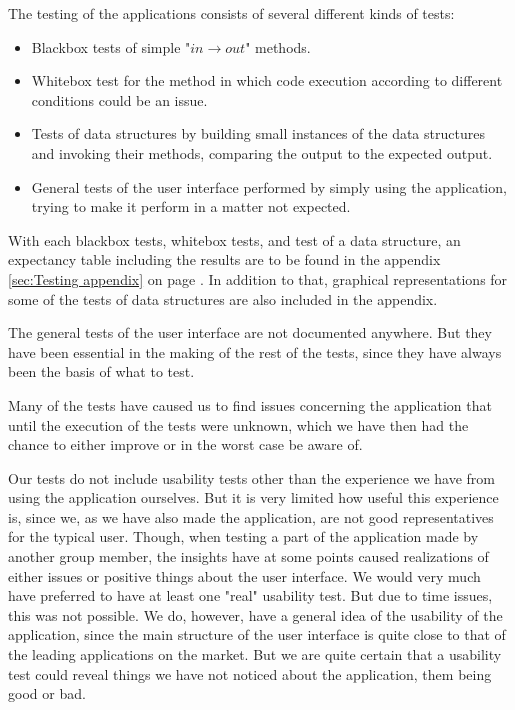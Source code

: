 The testing of the applications consists of several different kinds of tests:
\begin{itemize}
	\item Blackbox tests of simple "$in \rightarrow out$" methods.
	\item Whitebox test for the method in which code execution according to different conditions could be an issue.
	\item Tests of data structures by building small instances of the data structures and invoking their methods, comparing the output to the expected output.
	\item General tests of the user interface performed by simply using the application, trying to make it perform in a matter not expected.
\end{itemize}
With each blackbox tests, whitebox tests, and test of a data structure, an expectancy table including the results are to be found in the appendix \ref{sec:Testing appendix} on page \pageref{sec:Testing appendix}. In addition to that, graphical representations for some of the tests of data structures are also included in the appendix.

The general tests of the user interface are not documented anywhere. But they have been essential in the making of the rest of the tests, since they have always been the basis of what to test.

Many of the tests have caused us to find issues concerning the application that until the execution of the tests were unknown, which we have then had the chance to either improve or in the worst case be aware of.

Our tests do not include usability tests other than the experience we have from using the application ourselves. But it is very limited how useful this experience is, since we, as we have also made the application, are not good representatives for the typical user. Though, when testing a part of the application made by another group member, the insights have at some points caused realizations of either issues or positive things about the user interface. We would very much have preferred to have at least one "real" usability test. But due to time issues, this was not possible. We do, however, have a general idea of the usability of the application, since the main structure of the user interface is quite close to that of the leading applications on the market. But we are quite certain that a usability test could reveal things we have not noticed about the application, them being good or bad.